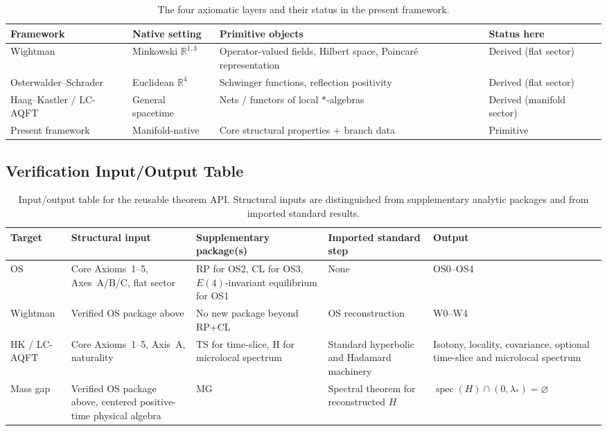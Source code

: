 \documentclass[12pt,a4paper]{article}
\theoremstyle{plain}
\theoremstyle{definition}
\theoremstyle{remark}
\newcommand{\spec}{\operatorname{spec}}
\newcommand{\real}{\mathbb{R}}
\begin{document}
\begin{table}[ht]
\centering
\renewcommand{\arraystretch}{1.2}
\begin{tabular}{@{}p{3.5cm}p{3.5cm}p{3.5cm}p{3.5cm}@{}}
\toprule
Framework & Native setting & Primitive objects & Status here \\
\midrule
Wightman & Minkowski $\real^{1,3}$ &
Operator-valued fields, Hilbert space, Poincar\'e representation &
Derived (flat sector) \\
Osterwalder--Schrader & Euclidean $\real^4$ &
Schwinger functions, reflection positivity &
Derived (flat sector) \\
Haag--Kastler / LC-AQFT & General spacetime &
Nets / functors of local $*$-algebras &
Derived (manifold sector) \\
Present framework & Manifold-native &
Core structural properties + branch data &
Primitive \\
\bottomrule
\end{tabular}
\caption{The four axiomatic layers and their status in the present
  framework.}
\label{tab:layers}
\end{table}

\subsection{Verification Input/Output Table}

\begin{table}[ht]
\centering
\renewcommand{\arraystretch}{1.2}
\begin{tabular}{@{}p{2.2cm}p{3.3cm}p{3.1cm}p{2.6cm}p{2.2cm}@{}}
\toprule
Target & Structural input & Supplementary package(s) &
Imported standard step & Output \\
\midrule
OS & Core Axioms~1--5, Axes~A/B/C, flat sector &
RP for OS2, CL for OS3, $E(4)$-invariant equilibrium for OS1 &
None & OS0--OS4 \\
Wightman & Verified OS package above &
No new package beyond RP+CL &
OS reconstruction & W0--W4 \\
HK / LC-AQFT & Core Axioms~1--5, Axis~A, naturality &
TS for time-slice, H for microlocal spectrum &
Standard hyperbolic and Hadamard machinery &
Isotony, locality, covariance, optional time-slice and microlocal spectrum \\
Mass gap & Verified OS package above, centered positive-time physical algebra &
MG &
Spectral theorem for reconstructed $H$ &
$\spec(H)\cap(0,\lambda_*)=\varnothing$ \\
\bottomrule
\end{tabular}
\caption{Input/output table for the reusable theorem API. Structural
  inputs are distinguished from supplementary analytic packages and
  from imported standard results.}
\label{tab:verification-io}
\end{table}
\end{document}
